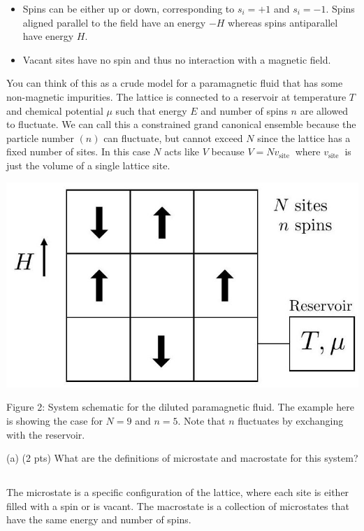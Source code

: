\documentclass[10pt]{article}
\begin{document}
\begin{itemize}
  \item Spins can be either up or down, corresponding to $s_{i}=+1$ and $s_{i}=-1$. Spins aligned parallel to the field have an energy $-H$ whereas spins antiparallel have energy $H$.
  \item Vacant sites have no spin and thus no interaction with a magnetic field.
\end{itemize}

You can think of this as a crude model for a paramagnetic fluid that has some non-magnetic impurities. The lattice is connected to a reservoir at temperature $T$ and chemical potential $\mu$ such that energy $E$ and number of spins $n$ are allowed to fluctuate. We can call this a constrained grand canonical ensemble because the particle number $(n)$ can fluctuate, but cannot exceed $N$ since the lattice has a fixed number of sites. In this case $N$ acts like $V$ because $V=N v_{\text {site }}$ where $v_{\text {site }}$ is just the volume of a single lattice site.

\begin{center}
\includegraphics[max width=\textwidth]{2024_02_03_75704bce2caff28cbfb1g-3}
\end{center}

Figure 2: System schematic for the diluted paramagnetic fluid. The example here is showing the case for $N=9$ and $n=5$. Note that $n$ fluctuates by exchanging with the reservoir.

(a) (2 pts) What are the definitions of microstate and macrostate for this system?
\subsection{}
The microstate is a specific configuration of the lattice, where each site is either filled with a spin or is vacant. The macrostate is a collection of microstates that have the same energy and number of spins.
\end{document}
